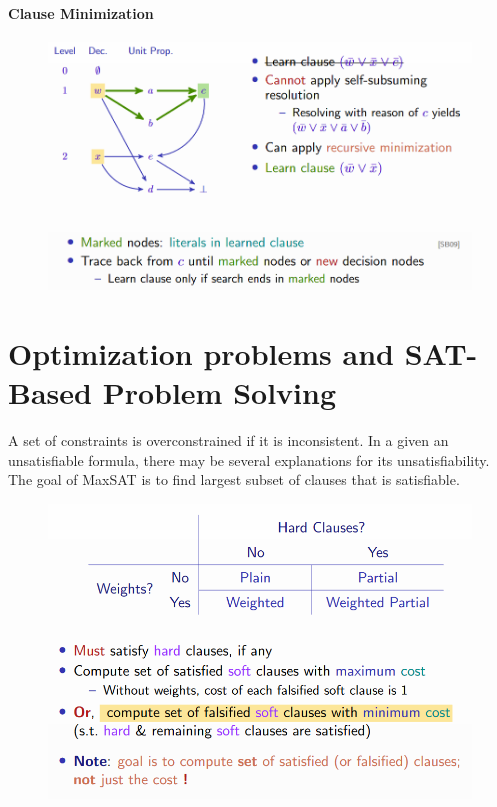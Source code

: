 \documentclass[10pt,a4paper]{report}
\begin{document}
\subsubsection{Clause Minimization}
\begin{figure}[H]
    \centering
    \includegraphics[scale=0.5]{8.png}
\end{figure}

\chapter{Optimization problems and SAT-Based Problem Solving}
A set of constraints is overconstrained if it is inconsistent. In a given an unsatisfiable formula, there may be several explanations for its unsatisfiability. The goal of MaxSAT is to find largest subset of clauses that is satisfiable.
\begin{figure}[H]
    \centering
    \includegraphics[scale=0.5]{9.png}
\end{figure}
\end{document}
